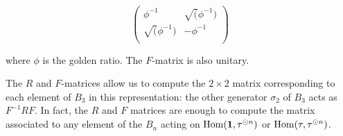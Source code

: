 \begin{equation}
\begin{pmatrix}
\phi^{-1} & \sqrt(\phi^{-1}) \\
\sqrt(\phi^{-1}) & -\phi^{-1} \\
\end{pmatrix}
\end{equation}

where $\phi$ is the golden ratio. The $F$-matrix is also unitary.

The $R$ and $F$-matrices allow us to compute the $2 \times 2$ matrix
corresponding to each element of $B_3$ in this representation: the other
generator $\sigma_2$ of $B_3$ acts as $F^{-1}RF$. In fact, the $R$ and $F$
matrices are enough to compute the matrix associated to any element of the
$B_n$ acting on $\operatorname{Hom}(\mathbf{1}, \tau^{\odot n})$ or $\operatorname{Hom}(\tau, \tau^{\odot n})$.

